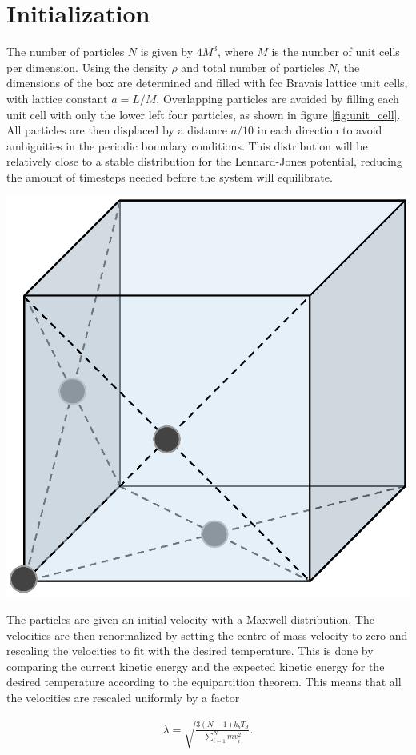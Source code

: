 \section{Initialization}
The number of particles $N$ is given by $4M^3$, where $M$ is the number of unit cells per dimension. Using the density $\rho$ and total number of particles $N$, the dimensions of the box are determined and filled with fcc Bravais lattice unit cells, with lattice constant $a=L/M$. Overlapping particles are avoided by filling each unit cell with only the lower left four particles, as shown in figure \ref{fig:unit_cell}. All particles are then displaced by a distance $a/10$ in each direction to avoid ambiguities in the periodic boundary conditions. This distribution will be relatively close to a stable distribution for the Lennard-Jones potential, reducing the amount of timesteps needed before the system will equilibrate.
\begin{Figure}
 \centering
 \includegraphics[width=0.35\linewidth]{fcc_cell.eps}
 \label{fig:unit_cell}
\end{Figure}

The particles are given an initial velocity with a Maxwell distribution\cite{jos}. The velocities are then renormalized by setting the centre of mass velocity to zero and rescaling the velocities to fit with the desired temperature. This is done by comparing the current kinetic energy and the expected kinetic energy for the desired temperature according to the equipartition theorem. This means that all the velocities are rescaled uniformly by a factor

\begin{gather*}
\lambda = \sqrt{\frac{3\left(N-1\right)k_bT_d}{\sum_{i=1}^Nmv_i^2}}.
\end{gather*}

